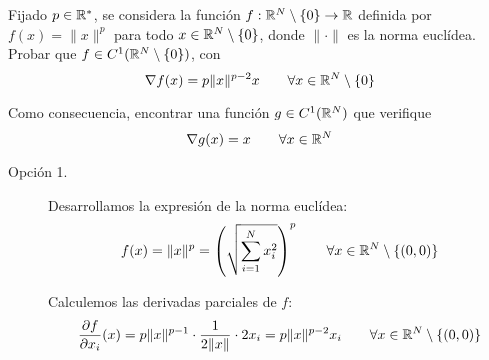 \begin{ejercicio}
    Fijado $p\in \mathbb{R}^\ast$, se considera la función $f:\mathbb{R}^N\setminus \{0\}\to \mathbb{R}$ definida por $f(x) = \|x\|^p$ para todo $x\in \mathbb{R}^N\setminus \{0\}$, donde $\|\cdot\|$ es la norma euclídea. Probar que $f\in C^1(\mathbb{R}^N\setminus \{0\})$, con
    \begin{equation*}
        \nabla f(x) = p\|x\|^{p-2}x \qquad \forall x\in \mathbb{R}^N\setminus \{0\}
    \end{equation*}

    \noindent
    Como consecuencia, encontrar una función $g\in C^1(\mathbb{R}^N)$ que verifique 
    \begin{equation*}
        \nabla g(x)=x \qquad \forall x\in \mathbb{R}^N
    \end{equation*}

    \begin{description}
        \item [Opción 1.] 
        Desarrollamos la expresión de la norma euclídea:
        \begin{equation*}
            f(x) = \|x\|^p = \left(\sqrt{\sum_{i=1}^N x_i^2}\right)^p \qquad \forall x\in \mathbb{R}^N\setminus \{(0,0)\}
        \end{equation*}

        Calculemos las derivadas parciales de $f$:
        \begin{equation*}
            \frac{\partial f}{\partial x_i}(x) = p\|x\|^{p-1}\cdot \frac{1}{2\|x\|}\cdot 2x_i = p\|x\|^{p-2}x_i \qquad \forall x\in \mathbb{R}^N\setminus \{(0,0)\}
        \end{equation*}


\end{description}
\end{ejercicio}
